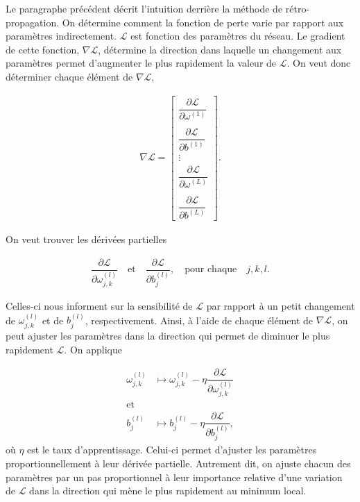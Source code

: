Le paragraphe précédent décrit l'intuition derrière la méthode de rétro-propagation. On détermine comment la fonction de perte varie par rapport aux paramètres indirectement.  $\mathcal{L}$ est fonction des paramètres du réseau. Le gradient de cette fonction, $\nabla \mathcal{L}$, détermine la direction dans laquelle un changement aux paramètres permet d'augmenter le plus rapidement la valeur de $\mathcal{L}$. On veut donc déterminer chaque élément de $\nabla \mathcal{L}$,


\begin{align*}
\nabla \mathcal{L}= 
	\begin{bmatrix}
	\dfrac{\partial\mathcal{L}}{\partial \omega^{(1)}}\\
	\\
	\dfrac{\partial\mathcal{L}}{\partial b^{(1)}}\\
	\vdots \\
	\dfrac{\partial \mathcal{L}}{\partial \omega^{(L)}}\\
	\\
	\dfrac{\partial \mathcal{L}}{\partial b^{(L)}}
	\end{bmatrix}.
\end{align*}


On veut trouver les dérivées partielles

\begin{align*}
\dfrac{\partial\mathcal{L}}{\partial \omega^{(l)}_{j,k}} \quad \text{et} \quad \dfrac{\partial\mathcal{L}}{\partial b^{(l)}_{j}},\quad \text{pour chaque}\quad j,k,l.
\end{align*}

Celles-ci nous informent sur la sensibilité de $\mathcal{L}$ par rapport à un petit changement de $\omega^{(l)}_{j,k}$ et de $b^{(l)}_{j} $, respectivement. Ainsi, à l'aide de chaque élément de $\nabla \mathcal{L}$, on peut ajuster les paramètres dans la direction qui permet de diminuer le plus rapidement $\mathcal{L}$. On applique

\begin{align*}
\omega^{(l)}_{j,k} &\mapsto \omega^{(l)}_{j,k} - \eta \dfrac{\partial\mathcal{L}}{\partial \omega^{(l)}_{j,k}} \\
\text{et} \\
b^{(l)}_{j} &\mapsto b^{(l)}_{j} -  \eta \dfrac{\partial\mathcal{L}}{\partial b^{(l)}_{j}},
\end{align*}
où $\eta$ est le taux d'apprentissage. Celui-ci permet d'ajuster les paramètres proportionnellement à leur dérivée partielle. Autrement dit, on ajuste chacun des paramètres par un pas proportionnel à leur importance relative d'une variation de $\mathcal{L}$ dans la direction qui mène le plus rapidement au minimum local. 

